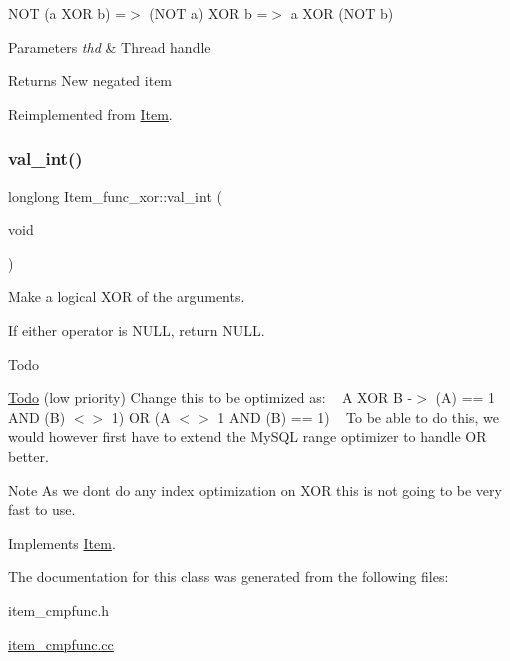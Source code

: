 N\+OT (a X\+OR b) =$>$ (N\+OT a) X\+OR b =$>$ a X\+OR (N\+OT b)


\begin{DoxyParams}{Parameters}
{\em thd} & Thread handle \\
\hline
\end{DoxyParams}
\begin{DoxyReturn}{Returns}
New negated item 
\end{DoxyReturn}


Reimplemented from \mbox{\hyperlink{classItem}{Item}}.

\mbox{\label{classItem__func__xor_abf20b3f1b71cb4c4b588c5a04d77ba05}} 
\subsubsection{\texorpdfstring{val\+\_\+int()}{val\_int()}}
{\footnotesize\ttfamily longlong Item\+\_\+func\+\_\+xor\+::val\+\_\+int (\begin{DoxyParamCaption}\item[{void}]{ }\end{DoxyParamCaption})\hspace{0.3cm}{\ttfamily [virtual]}}

Make a logical X\+OR of the arguments.

If either operator is N\+U\+LL, return N\+U\+LL.

\begin{DoxyRefDesc}{Todo}
\item[\mbox{\hyperlink{todo__todo000032}{Todo}}](low priority) Change this to be optimized as\+: ~\newline
 A X\+OR B -\/$>$ (A) == 1 A\+ND (B) $<$$>$ 1) OR (A $<$$>$ 1 A\+ND (B) == 1) ~\newline
 To be able to do this, we would however first have to extend the My\+S\+QL range optimizer to handle OR better.\end{DoxyRefDesc}


\begin{DoxyNote}{Note}
As we don\textquotesingle{}t do any index optimization on X\+OR this is not going to be very fast to use. 
\end{DoxyNote}


Implements \mbox{\hyperlink{classItem}{Item}}.



The documentation for this class was generated from the following files\+:\begin{DoxyCompactItemize}
\item 
item\+\_\+cmpfunc.\+h\item 
\mbox{\hyperlink{item__cmpfunc_8cc}{item\+\_\+cmpfunc.\+cc}}\end{DoxyCompactItemize}
